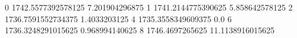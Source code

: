 0 1742.5577392578125 7.201904296875
1 1741.2144775390625 5.858642578125
2 1736.7591552734375 1.4033203125
4 1735.3558349609375 0.0
6 1736.3248291015625 0.968994140625
8 1746.4697265625 11.1138916015625
